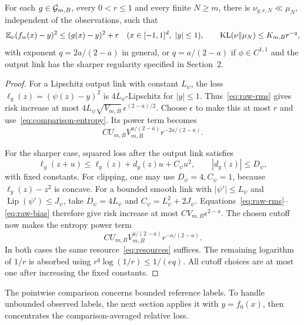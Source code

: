\begin{lemma}\label{lem:comparison}
For each $g\in\mathcal G_{m,B}$, every $0<r\le1$ and every finite $N\ge m$, there is $\nu_{g,r,N}\ll\mu_N$, independent of the observations, such that
\begin{equation}
 \mathbb E_\nu(f_w(x)-y)^2\le(g(x)-y)^2+r
 \quad(x\in[-1,1]^d,\ |y|\le1),\qquad
 \operatorname{KL}(\nu\|\mu_N)\le K_{m,B}r^{-q},
 \label{eq:risk-comparison}
\end{equation}
with exponent $q=2a/(2-a)$ in general, or $q=a/(2-a)$ if $\phi\in C^{1,1}$ and the output link has the sharper regularity specified in Section~2.
\end{lemma}
\begin{proof}
For a Lipschitz output link with constant $L_\psi$, the loss
$\ell_y(z)=(\psi(z)-y)^2$ is $4L_\psi$-Lipschitz for $|y|\le1$.
Thus~\eqref{eq:raw-rms} gives risk increase at most
$4L_\psi\sqrt{V_{m,B}}\,\epsilon^{(2-a)/2}$.
Choose $\epsilon$ to make this at most $r$ and use~\eqref{eq:comparison-entropy}. Its power term becomes
\[
 C U_{m,B}V_{m,B}^{a/(2-a)}r^{-2a/(2-a)}.
\]

For the sharper case, squared loss after the output link satisfies
\[
 \ell_y(z+u)\le\ell_y(z)+d_y(z)u+C_\psi u^2,
 \qquad |d_y(z)|\le D_\psi,
\]
with fixed constants. For clipping, one may use $D_\psi=4,C_\psi=1$, because $\ell_y(z)-z^2$ is concave. For a bounded smooth link with $|\psi'|\le L_\psi$ and $\operatorname{Lip}(\psi')\le J_\psi$, take
$D_\psi=4L_\psi$ and $C_\psi=L_\psi^2+2J_\psi$.
Equations~\eqref{eq:raw-rms}--\eqref{eq:raw-bias} therefore give risk increase at most $C V_{m,B}\epsilon^{2-a}$. The chosen cutoff now makes the entropy power term
\[
 C U_{m,B}V_{m,B}^{a/(2-a)}r^{-a/(2-a)}.
\]
In both cases the same resource~\eqref{eq:resources} suffices. The remaining logarithm of $1/r$ is absorbed using $r^q\log(1/r)\le1/(eq)$. All cutoff choices are at most one after increasing the fixed constants.
\end{proof}

The pointwise comparison concerns bounded reference labels. To handle unbounded observed labels, the next section applies it with $y=f_0(x)$, then concentrates the comparison-averaged relative loss.
